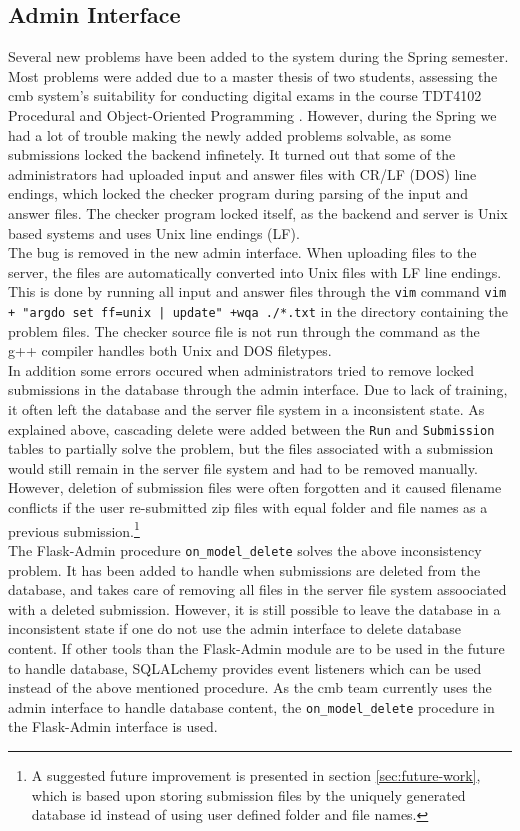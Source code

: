 \subsection{Admin Interface}
Several new problems have been added to the system during the Spring semester. Most problems were added due to a master thesis of two students, assessing the \gls{cmb} system's suitability for conducting digital exams in the course TDT4102 Procedural and Object-Oriented Programming \cite{TDT4102}. However, during the Spring we had a lot of trouble making the newly added problems solvable, as some submissions locked the backend infinetely. It turned out that some of the administrators had uploaded input and answer files with CR/LF (DOS) line endings, which locked the checker program during parsing of the input and answer files. The checker program locked itself, as the backend and server is Unix based systems and uses Unix line endings (LF). \\

The bug is removed in the new admin interface. When uploading files to the server, the files are automatically converted into Unix files with LF line endings. This is done by running all input and answer files through the \texttt{vim} \cite{VIM} command \texttt{vim + "argdo set ff=unix | update" +wqa ./*.txt} in the directory containing the problem files. The checker source file is not run through the command as the g++ compiler handles both Unix and DOS filetypes. \\

In addition some errors occured when administrators tried to remove locked submissions in the database through the admin interface. Due to lack of training, it often left the database and the server file system in a inconsistent state. As explained above, cascading delete were added between the \texttt{Run} and \texttt{Submission} tables to partially solve the problem, but the files associated with a submission would still remain in the server file system and had to be removed manually. However, deletion of submission files were often forgotten and it caused filename conflicts if the user re-submitted zip files with equal folder and file names as a previous submission.\footnote{A suggested future improvement is presented in section \ref{sec:future-work}, which is based upon storing submission files by the uniquely generated database id instead of using user defined folder and file names.}\\

The Flask-Admin \cite{FLASKADMIN} procedure \texttt{on\_model\_delete} solves the above inconsistency problem. It has been added to handle when submissions are deleted from the database, and takes care of removing all files in the server file system assoociated with a deleted submission. However, it is still possible to leave the database in a inconsistent state if one do not use the admin interface to delete database content. If other tools than the Flask-Admin module are to be used in the future to handle database, SQLALchemy provides event listeners which can be used instead of the above mentioned procedure. As the \gls{cmb} team currently uses the admin interface to handle database content, the \texttt{on\_model\_delete} procedure in the Flask-Admin interface is used.


